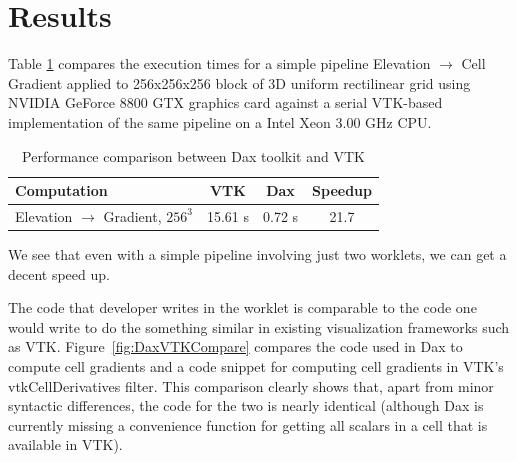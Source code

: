 \documentclass{vgtc}                          %
\begin{document}
\section{Results}
\label{sec:Results}

Table \ref{tab:Results} compares the execution times for a simple pipeline
Elevation $\rightarrow$ Cell Gradient applied to 256x256x256 block of 3D uniform
rectilinear grid using NVIDIA GeForce 8800 GTX graphics card against a serial VTK-based
implementation of the same pipeline on a Intel Xeon 3.00 GHz CPU.

\begin{table}[htbp]
  \centering
  \caption{Performance comparison between Dax toolkit and VTK}
  \label{tab:Results}
  \vspace{6pt}
  \begin{tabular}{lccc}
    Computation & VTK & Dax & Speedup \\
    \hline
    Elevation $\rightarrow$ Gradient, $256^3$ & 15.61 s & 0.72 s & 21.7
  \end{tabular}
\end{table}

We see that even with a simple pipeline involving just two worklets, we can
get a decent speed up.

The code that developer writes in the worklet is comparable to the code
one would write to do the something similar in existing visualization frameworks
such as VTK. Figure~\ref{fig:DaxVTKCompare} compares the code used in Dax
to compute cell gradients and a code snippet for computing cell gradients
in VTK's vtkCellDerivatives filter.  This comparison clearly shows that,
apart from minor syntactic differences, the code for the two is nearly
identical (although Dax is currently missing a convenience function for
getting all scalars in a cell that is available in VTK).
\end{document}
